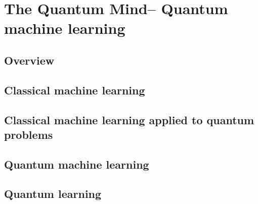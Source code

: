 %
%

\section{The Quantum Mind\texttrademark -- Quantum machine learning}\label{sec:quantum_mind}

\cite{bib:lloyd2013quantum}


\subsection{Overview}

\subsection{Classical machine learning}

\subsection{Classical machine learning applied to quantum problems}

\subsection{Quantum machine learning}

\subsection{Quantum learning}
